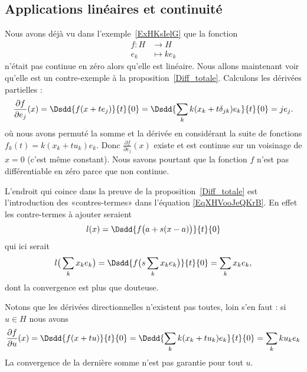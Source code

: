 \subsection{Applications linéaires et continuité}

Nous avons déjà vu dans l'exemple~\ref{ExHKsIelG} que la fonction
\begin{equation}    \label{EqCJVooJOuXdN}
    \begin{aligned}
        f\colon H&\to H \\
        e_k&\mapsto ke_k
    \end{aligned}
\end{equation}
n'était pas continue en zéro alors qu'elle est linéaire. Nous allons maintenant voir qu'elle est un contre-exemple à la proposition~\ref{Diff_totale}. Calculons les dérivées partielles :
\begin{equation}
    \frac{ \partial f }{ \partial e_j }(x)=\Dsdd{ f(x+te_j) }{t}{0}=\Dsdd{ \sum_k k(x_k+t\delta_{jk})e_k }{t}{0}=je_j.
\end{equation}
où nous avons permuté la somme et la dérivée en considérant la suite de fonctions \( f_k(t)=k(x_k+tu_k)e_k\). Donc \( \frac{ \partial f }{ \partial e_j }(x)\) existe et est continue sur un voisinage de \( x=0\) (c'est même constant). Nous savons pourtant que la fonction \( f\) n'est pas différentiable en zéro parce que non continue.

L'endroit qui coince dans la preuve de la proposition~\ref{Diff_totale} est l'introduction des «contres-termes» dans l'équation \eqref{EqXHVooJeQKrB}. En effet les contre-termes à ajouter seraient
\begin{equation}
    l(x)=\Dsdd{ f\big( a+s(x-a) \big) }{t}{0}
\end{equation}
qui ici serait
\begin{equation}
    l\big( \sum_kx_ke_k \big)=\Dsdd{ f\big( s\sum_kx_ke_k \big) }{t}{0}=\sum_kx_ke_k,
\end{equation}
dont la convergence est plus que douteuse.

Notons que les dérivées directionnelles n'existent pas toutes, loin s'en faut : si \( u\in H\) nous avons
\begin{equation}        \label{EQooWNLOooJNRUMQ}
    \frac{ \partial f }{ \partial u }(x)=\Dsdd{ f(x+tu) }{t}{0}=\Dsdd{ \sum_k k(x_k+tu_k)e_k }{t}{0}=\sum_k ku_ke_k
\end{equation}
La convergence de la dernière somme n'est pas garantie pour tout \( u\).

